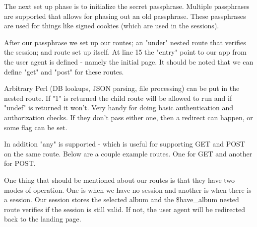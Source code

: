 \documentclass[14pt]{extreport}
\newcommand\Small{\fontsize{12}{13.0}\fontencoding{T1}\selectfont}
\newcommand*\LSTfont{\Small\ttfamily\SetTracking{encoding=*}{-60}\lsstyle}
\begin{document}
The next set up phase is to initialize the secret passphrase.  Multiple
passphrases are supported that allows for phasing out an old passphrase.  These
passphrases are used for things like signed cookies (which are used in the
sessions).





After our passphrase we set up our routes; an "under" nested route that verifies
the session; and route set up itself.  At line 15 the "entry" point to our app
from the user agent is defined - namely the initial page.  It should be noted
that we can define "get" and "post" for these routes.  



Arbitrary Perl (DB lookups, JSON parsing, file processing) can be put in the
nested route.  If "1" is returned the child route will be allowed to run and if
"undef" is returned it won't.  Very handy for doing basic authentication and
authorization checks.  If they don't pass either one, then a redirect can
happen, or some flag can be set.

In addition "any" is supported - which is useful for supporting GET and POST on
the same route.  Below are a couple example routes.  One for GET and another
for POST.



One thing that should be mentioned about our routes is that they have two modes of
operation.  One is when we have no session and another is when there is a session.
Our session stores the selected album and the \$have\_album nested route verifies
if the session is still valid.  If not, the user agent will be redirected back to the
landing page.
\end{document}
